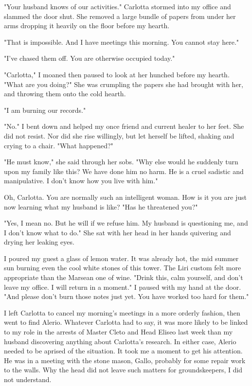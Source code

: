 \documentclass{article}
\begin{document}
\vspace{.5cm}

"Your husband knows of our activities." Carlotta stormed into my office and slammed the door shut. She removed a large bundle of papers from under her arms dropping it heavily on the floor before my hearth.

"That is impossible. And I have meetings this morning. You cannot stay here."

"I've chased them off. You are otherwise occupied today."

"Carlotta," I moaned then paused to look at her hunched before my hearth. "What are you doing?" She was crumpling the papers she had brought with her, and throwing them onto the cold hearth. 

"I am burning our records."

"No." I bent down and helped my once friend and current healer to her feet. She did not resist. Nor did she rise willingly, but let herself be lifted, shaking and crying to a chair. "What happened?"

"He must know," she said through her sobs. "Why else would he suddenly turn upon my family like this? We have done him no harm. He is a cruel sadistic and manipulative. I don't know how you live with him."

Oh, Carlotta. You are normally such an intelligent woman. How is it you are just now learning what my husband is like? "Has he threatened you?"

"Yes, I mean no. But he will if we refuse him. My husband is questioning me, and I don't know what to do." She sat with her head in her hands quivering and drying her leaking eyes.

I poured my guest a glass of lemon water. It was already hot, the mid summer sun burning even the cool white stones of this tower. The Liri custom felt more appropriate than the Marsean one of wine. "Drink this, calm yourself, and don't leave my office. I will return in a moment." I paused with my hand at the door. "And please don't burn those notes just yet. You have worked too hard for them."

I left Carlotta to cancel my morning's meetings in a more orderly fashion, then went to find Alerio. Whatever Carlotta had to say, it was more likely to be linked to my role in the arrests of Master Cleto and Head Eliseo last week than my husband discovering anything about Carlotta's research. In either case, Alerio needed to be aprised of the situation. It took me a moment to get his attention. He was in a meeting with the stone mason, Gallo, probably for some repair work to the walls. Why the head did not leave such matters for groundskeepers, I did not understand.
\end{document}
